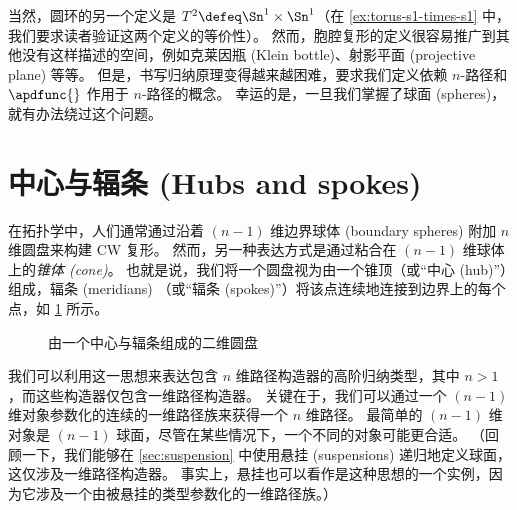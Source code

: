 当然，圆环的另一个定义是 $T^2 \defeq \Sn^1 \times \Sn^1$（在 \cref{ex:torus-s1-times-s1} 中，我们要求读者验证这两个定义的等价性）。
%
%
然而，胞腔复形的定义很容易推广到其他没有这样描述的空间，例如克莱因瓶 (Klein bottle)、射影平面 (projective plane) 等等。
但是，书写归纳原理变得越来越困难，要求我们定义依赖 $n$-路径和 $\apdfunc{}$ 作用于 $n$-路径的概念。
幸运的是，一旦我们掌握了球面 (spheres)，就有办法绕过这个问题。

\section{中心与辐条 (Hubs and spokes)}
\label{sec:hubs-spokes}

%
%

在拓扑学中，人们通常通过沿着 $(n-1)$ 维边界球体 (boundary spheres) 附加 $n$ 维圆盘来构建 CW 复形。%
然而，另一种表达方式是通过粘合在 $(n-1)$ 维球体上的\emph{锥体 (cone)}。
也就是说，我们将一个圆盘视为由一个锥顶（或“中心 (hub)”）组成，辐条 (meridians)%
（或“辐条 (spokes)”）将该点连续地连接到边界上的每个点，如 \cref{fig:hub-and-spokes} 所示。

\begin{figure}
  \centering
  \caption{由一个中心与辐条组成的二维圆盘}
  \label{fig:hub-and-spokes}
\end{figure}

我们可以利用这一思想来表达包含 $n$ 维路径构造器的高阶归纳类型，其中 $n>1$，而这些构造器仅包含一维路径构造器。
关键在于，我们可以通过一个 $(n-1)$ 维对象参数化的连续的一维路径族来获得一个 $n$ 维路径。
最简单的 $(n-1)$ 维对象是 $(n-1)$ 球面，尽管在某些情况下，一个不同的对象可能更合适。
（回顾一下，我们能够在 \cref{sec:suspension} 中使用悬挂 (suspensions) 递归地定义球面，这仅涉及一维路径构造器。
事实上，悬挂也可以看作是这种思想的一个实例，因为它涉及一个由被悬挂的类型参数化的一维路径族。）

